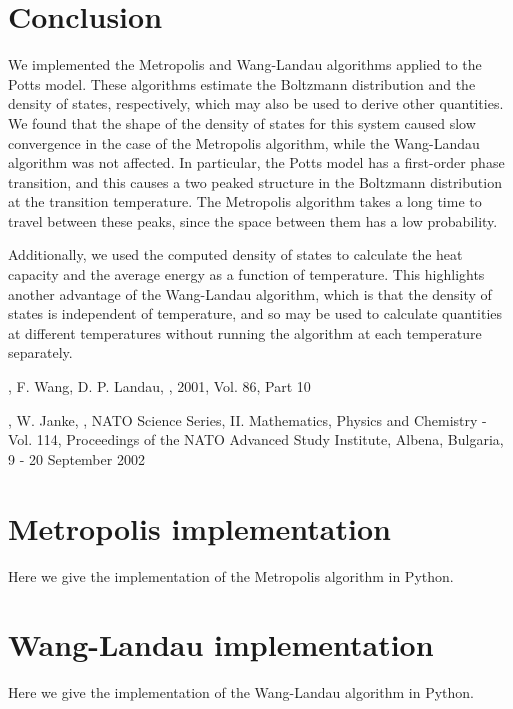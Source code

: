 \documentclass{article}
\begin{document}
\section{Conclusion}
We implemented the Metropolis and Wang-Landau algorithms applied to the Potts model.
These algorithms estimate the Boltzmann distribution and the density of states, respectively, which may also be used to derive other quantities.
We found that the shape of the density of states for this system caused slow convergence in the case of the Metropolis algorithm, while the Wang-Landau algorithm was not affected.
In particular, the Potts model has a first-order phase transition, and this causes a two peaked structure in the Boltzmann distribution at the transition temperature.
The Metropolis algorithm takes a long time to travel between these peaks, since the space between them has a low probability.

Additionally, we used the computed density of states to calculate the heat capacity and the average energy as a function of temperature.
This highlights another advantage of the Wang-Landau algorithm, which is that the density of states is independent of temperature, and so may be used to calculate quantities at different temperatures without running the algorithm at each temperature separately.

\begin{thebibliography}{9}

,
\newblock F. Wang, D. P. Landau,
, 2001, Vol. 86, Part 10

,
\newblock W. Janke,
, NATO Science Series, II. Mathematics, Physics and Chemistry - Vol. 114, Proceedings of the NATO Advanced Study Institute, Albena, Bulgaria, 9 - 20 September 2002

\end{thebibliography}
\appendix
\section{Metropolis implementation}
Here we give the implementation of the Metropolis algorithm in Python.

\section{Wang-Landau implementation}
Here we give the implementation of the Wang-Landau algorithm in Python.

\end{document}
